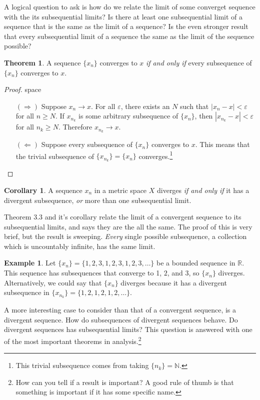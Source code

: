 \documentclass{article}
\newcommand{\N}{\mathbb{N}}
\newcommand{\R}{\mathbb{R}}
\theoremstyle{definition}
\newtheorem{theorem}{Theorem}[section]
\newtheorem{corollary}{Corollary}[section]
\newtheorem{example}{Example}[section]
\begin{document}
A logical question to ask is how do we relate the limit of some converget sequence with the its subsequential limits? Is there at least one subsequential limit of a sequence that is the same as the limit of a sequence? Is the even stronger result that every subsequential limit of a sequence the same as the limit of the sequence possible? 
\begin{theorem}
	A sequence $ \{x_n\} $ converges to $ x $ \textit{if and only if} every subsequence of $ \{x_n\} $ converges to $ x $.
\end{theorem} 
\begin{proof}{\color{white}space}
	\begin{enumerate}
		\item [$ (\Longrightarrow) $] Suppose $ x_n\to x $. For all $ \varepsilon $, there exists an $N $ such that $ |x_n-x|<\varepsilon $ for all $ n\ge N $. If $ x_{n_k} $ is some arbitrary subsequence of $ \{x_n\} $, then $ |x_{n_k}-x|<\varepsilon $ for all $ n_k\ge N $. Therefore $ x_{n_k}\to x $. 
		\item [$ (\Longleftarrow) $]  Suppose every subsequence of $ \{x_n\} $ converges to $ x $. This means that the trivial subsequence of $ \{x_{n_k}\}=\{x_n\} $ converges.\footnote{This trivial subsequence comes from taking $ \{n_k\}=\N $.} 
	\end{enumerate}
\end{proof}
\begin{corollary}
	A sequence $ x_n $ in a metric space $ X $ diverges \textit{if and only if} it has a divergent subsequence, \textit{or} more than one subsequential limit. 
\end{corollary}
Theorem 3.3 and it's corollary relate the limit of a convergent sequence to its subsequential limits, and says they are the all the same. The proof of this is very brief, but the result is sweeping. \textit{Every} single possible subsequence, a collection which is uncountably infinite, has the same limit.    
\begin{example}
	Let $ \{x_n\}=\{1,2,3,1,2,3,1,2,3,\ldots\} $ be a bounded sequence in $ \R $. This sequence has subsequences that converge to 1, $2 $, and 3, so $ \{x_n\} $ diverges. Alternatively, we could say that $ \{x_n\} $ diverges because it has a divergent subsequence in $ \{x_{n_k}\}=\{1,2,1,2,1,2,\ldots\} $.  
\end{example}
A more interesting case to consider than that of a convergent sequence, is a divergent sequence. How do subsequences of divergent sequences behave. Do divergent sequences has subsequential limits? This question is answered with one of the most important theorems in analysis.\footnote{How can you tell if a result is important? A good rule of thumb is that something is important if it has some specific name.}
\end{document}

